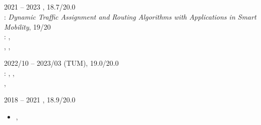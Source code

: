 \documentclass{cv}
\newif\ifen
\newif\ifpt
\newcommand{\en}[1]{\ifen#1\fi}
\newcommand{\pt}[1]{\ifpt#1\fi}
\begin{document}
\subsection*{\en{Education}}
\begin{job}{\en{Master in Informatics and Computing Engineering}}{2021 -- 2023}
    \en{Faculty of Engineering of the University of Porto}, \en{grade} 18.7/20.0
    \\\en{Thesis}: \textit{Dynamic Traffic Assignment and Routing Algorithms with Applications in Smart Mobility}, \en{grade} 19/20
    \\ \en{Elective modules}: \en{Advanced Data Structures and Algorithms}, \\ \en{Embedded and Real Time Systems}, \en{Computer Systems Security}, \en{Optimization}
\end{job}
\begin{job}{\en{Master in Informatics (Erasmus)}}{2022/10 -- 2023/03}
    \en{Technical University of Munich} (TUM), \en{grade} 19.0/20.0
    \\ \en{Modules}: \en{Cloud Systems Engineering}, \en{Cloud-Based Data Processing},\\ \en{Advanced Topics of Software Engineering}, \en{Query Optimization}
\end{job}
\begin{job}{\en{Bachelor in Informatics and Computing Engineering}}{2018 -- 2021}
    \en{Faculty of Engineering of the University of Porto}, \en{grade} 18.9/20.0
    \begin{itemize}[noitemsep,topsep=1pt,leftmargin=10pt]
        \item\textit{\en{Incentive Prize}} \en{of the University of Porto}, \en{for best grade of FEUP in freshman year}
    \end{itemize}
\end{job}
\end{document}
